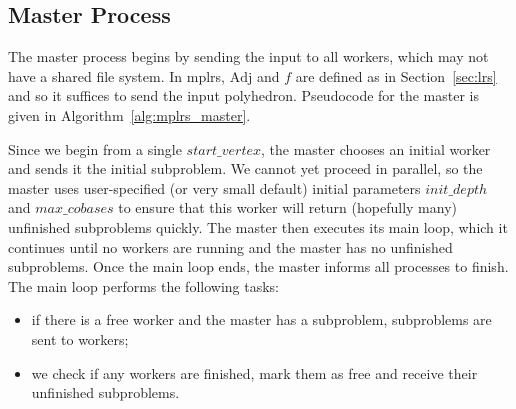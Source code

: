\documentclass[a4paper,11pt]{article}   \usepackage{authblk} \usepackage[top=1.9cm,bottom=1.9cm,left=1.9cm,right=1.9cm]{geometry}
\newcommand{\progname}{\textsf}
\newcommand{\mplrs}{\progname{mplrs}\xspace}
\newcommand{\Adj}{\textrm{Adj}}
\newcommand{\initdepth}{\ensuremath{\mathit{init\_depth}}\xspace}
\newcommand{\maxcobases}{\ensuremath{\mathit{max\_cobases}}\xspace}
\newcommand{\startvertex}{\ensuremath{\mathit{start\_vertex}}\xspace}
\begin{document}
\subsection{Master Process}
\label{subsec:mplrs_master}

The master process begins by sending the input to all workers,
which may not have a shared file system.
In \mplrs, $\Adj$ and $f$ are defined as in
Section~\ref{sec:lrs} and so it suffices to send the input polyhedron.
Pseudocode for the master is given
in Algorithm~\ref{alg:mplrs_master}.

Since we begin from a single \startvertex, the master chooses an
initial worker and sends it the initial subproblem.  We cannot yet
proceed in parallel, so the master uses user-specified (or
very small default) 
initial parameters
\initdepth and \maxcobases to ensure that this worker will
return (hopefully many) unfinished subproblems quickly.
The master then executes its main loop, which it continues until
no workers are running and the master has no unfinished subproblems.
Once the main loop ends, the master informs all processes to finish.
The main loop performs the following tasks:
\begin{itemize}
 \item if there is a free worker and the master has a subproblem, subproblems
       are sent to workers;
 \item we check if any workers are finished, mark them as free and receive 
       their unfinished subproblems.
\end{itemize}
\end{document}
